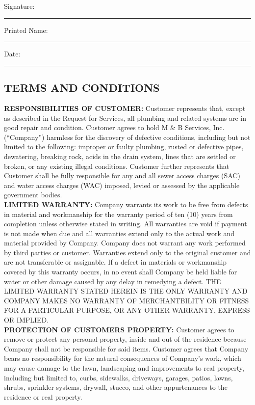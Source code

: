 \documentclass{article}
\begin{document}
\noindent Signature: \rule{4cm}{0.4pt}\hspace{0.5cm} Printed Name: \rule{4cm}{0.4pt}\hspace{0.5cm} Date: \rule{2cm}{0.4pt}

\newpage

\begin{footnotesize}
\begin{center}
\section*{TERMS AND CONDITIONS}    
\end{center}

\noindent \textbf{RESPONSIBILITIES OF CUSTOMER:} Customer represents that, except as described in the Request for Services, all plumbing and related systems are in good repair and condition. Customer agrees to hold M \& B Services, Inc. (“Company”) harmless for the discovery of defective conditions, including but not limited to the following: improper or faulty plumbing, rusted or defective pipes, dewatering, breaking rock, acids in the drain system, lines that are settled or broken, or any existing illegal conditions. Customer further represents that Customer shall be fully responsible for any and all sewer access charges (SAC) and water access charges (WAC) imposed, levied or assessed by the applicable government bodies. \\

\noindent \textbf{LIMITED WARRANTY:} Company warrants its work to be free from defects in material and workmanship for the warranty period of ten (10) years from completion unless otherwise stated in writing. All warranties are void if payment is not made when due and all warranties extend only to the actual work and material provided by Company. Company does not warrant any work performed by third parties or customer. Warranties extend only to the original customer and are not transferable or assignable. If a defect in materials or workmanship covered by this warranty occurs, in no event shall Company be held liable for water or other damage caused by any delay in remedying a defect. THE LIMITED WARRANTY STATED HEREIN IS THE ONLY WARRANTY AND COMPANY MAKES NO WARRANTY OF MERCHANTBILITY OR FITNESS FOR A PARTICULAR PURPOSE, OR ANY OTHER WARRANTY, EXPRESS OR IMPLIED. \\

\noindent \textbf{PROTECTION OF CUSTOMERS PROPERTY:} Customer agrees to remove or protect any personal property, inside and out of the residence because Company shall not be responsible for said items. Customer agrees that Company bears no responsibility for the natural consequences of Company’s work, which may cause damage to the lawn, landscaping and improvements to real property, including but limited to, curbs, sidewalks, driveways, garages, patios, lawns, shrubs, sprinkler systems, drywall, stucco, and other appurtenances to the residence or real property. \\


\end{footnotesize}
\end{document}

